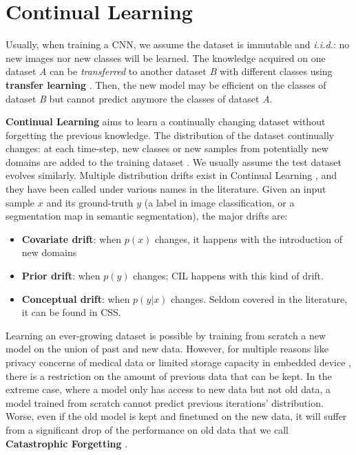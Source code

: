 \section{Continual Learning}
\label{sec:related_continual}

Usually, when training a \ac{CNN}, we assume the dataset is immutable and \textit{i.i.d.}: no new
images nor new classes will be learned. The knowledge acquired on one dataset \textit{A} can be
\textit{transferred} to another dataset \textit{B} with different classes using \textbf{transfer learning}
\citep{razavian2014transferlearning}. Then, the new model may be efficient on
the classes of dataset \textit{B} but cannot predict anymore the classes of dataset \textit{A}.

\textbf{Continual Learning} aims to learn a continually changing dataset without forgetting the
previous knowledge. The distribution of the dataset continually changes: \eg at each time-step, new
classes or new samples from potentially new domains are added to the training dataset
\citep{lomonaco2017core50}. We usually assume the test dataset evolves similarly. Multiple
distribution drifts exist in Continual Learning
\citep{morenotorresa2012datasetshift,lesort2021driftanalysis}, and they have been called under
various names in the literature. Given an input sample $x$ and its ground-truth $y$ (a label in
image classification, or a segmentation map in semantic segmentation), the major drifts are:

\begin{itemize}
      \item \textbf{Covariate drift}: when $p(x)$ changes, it happens with the introduction of new
            domains \citep{volpi2021continualdomainadapt}
      \item \textbf{Prior drift}: when $p(y)$ changes; \ac{CIL} happens with this kind of drift.
      \item \textbf{Conceptual drift}: when $p(y | x)$ changes. Seldom covered in the literature, it
            can be found in \acf{CSS}.
\end{itemize}

Learning an ever-growing dataset is possible by training from scratch a new model on the union of
past and new data. However, for multiple reasons like privacy concerns of medical data or limited
storage capacity in embedded device \citep{vasquez2017incrementalneuralforest}, there is a
restriction on the amount of previous data that can be kept. In the extreme case, where a model only
has access to new data but not old data, a model trained from scratch cannot predict previous
iterations' distribution. Worse, even if the old model is kept and finetuned on the new data, it
will suffer from a significant drop of the performance on old data that we call \textbf{Catastrophic
      Forgetting} \citep{robins1995catastrophicforgetting}.

